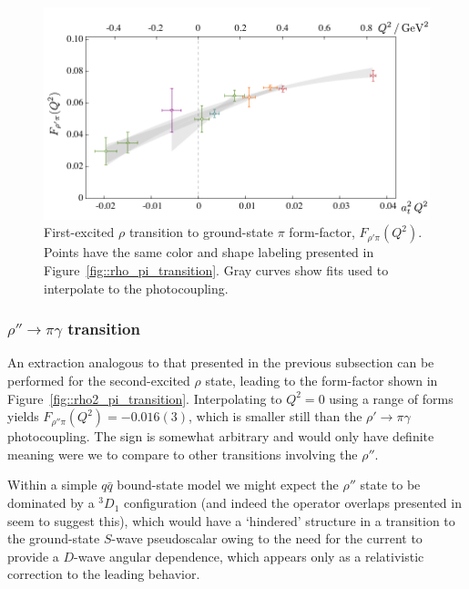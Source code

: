 \documentclass[twocolumn,amsmath,amssymb,prd,10pt,floatfix, 
superscriptaddress,nofootinbib, showpacs, preprintnumbers]{revtex4-1}
\begin{document}
\begin{figure}[h]
  \includegraphics[width=\linewidth]{fig19.pdf}
  \caption{First-excited $\rho$ transition to ground-state $\pi$ form-factor, $F_{\rho'\pi}(Q^2)$. Points have the same color and shape labeling presented in Figure~\ref{fig::rho_pi_transition}. Gray curves show fits used to interpolate to the photocoupling. \label{fig::rho1_pi_transition}}
\end{figure}


\subsubsection{$\rho''\rightarrow \pi \gamma$ transition}



An extraction analogous to that presented in the previous subsection can be performed for the second-excited $\rho$ state, leading to the form-factor shown in Figure~\ref{fig::rho2_pi_transition}. Interpolating to $Q^2=0$ using a range of forms yields $F_{\rho'' \pi}(Q^2) = -0.016(3)$, which is smaller still than the $\rho' \to \pi \gamma$ photocoupling. The sign is somewhat arbitrary and would only have definite meaning were we to compare to other transitions involving the $\rho''$.

Within a simple $q\bar{q}$ bound-state model we might expect the $\rho''$ state to be dominated by a $^3\!D_1$ configuration (and indeed the operator overlaps presented in \cite{Dudek:2011bn} seem to suggest this), which would have a `hindered' structure in a transition to the ground-state $S$-wave pseudoscalar owing to the need for the current to provide a $D$-wave angular dependence, which appears only as a relativistic correction to the leading behavior. 
\end{document}
